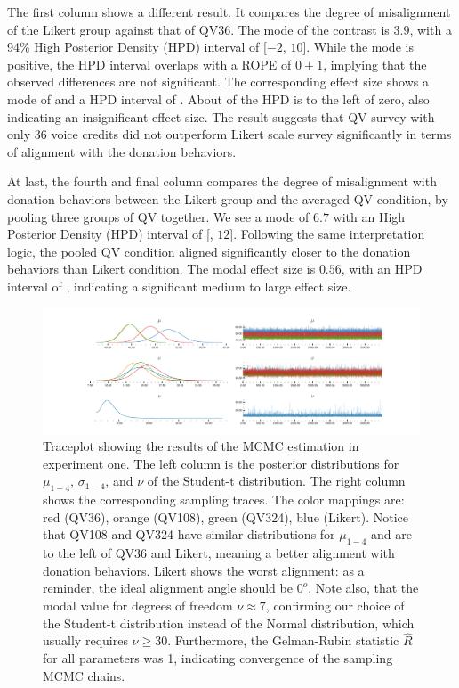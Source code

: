 The first column shows a different result. It compares the degree of misalignment of the Likert group against that of QV36. The mode of the contrast is $3.9$, with a 94\% High Posterior Density (HPD) interval of [$-2$, $10$]. While the mode is positive, the HPD interval overlaps with a ROPE of $0 \pm 1$, implying that the observed differences are not significant. The corresponding effect size shows a mode of {} and a HPD interval of {\change{[$-0.13$, $0.66$]}}. About {} of the HPD is to the left of zero, also indicating an insignificant effect size. The result suggests that QV survey with only 36 voice credits did not outperform Likert scale survey significantly in terms of alignment with the donation behaviors.

At last, the fourth and final column compares the degree of misalignment with donation behaviors between the Likert group and the averaged QV condition, by pooling three groups of QV together. We see a mode of $6.7$ with an High Posterior Density (HPD) interval of [{}, $12$]. Following the same interpretation logic, the pooled QV condition aligned significantly closer to the donation behaviors than Likert condition. The modal effect size is $0.56$, with an HPD interval of {\change{[$0.13$, $0.99$]}}, indicating a significant medium to large effect size.

\begin{figure}
  \centering
  \includegraphics[trim= 2in 0in 2in 0in, clip, width=\textwidth, keepaspectratio=true]{content/image/StudentTIndep_VA_traceplot.pdf}
  \caption{
    Traceplot showing the results of the MCMC estimation in experiment one. The left column is the posterior distributions for $\mu_{1-4}$, $\sigma_{1-4}$, and $\nu$ of the Student-t distribution. The right column shows the corresponding sampling traces. The color mappings are: red (QV36), orange (QV108), green (QV324), blue (Likert). Notice that QV108 and QV324 have similar distributions for $\mu_{1-4}$ and are to the left of QV36 and Likert, meaning a better alignment with donation behaviors. Likert shows the worst alignment: as a reminder, the ideal alignment angle should be $0^o$. Note also, that the modal value for degrees of freedom $\nu \approx 7$, confirming our choice of the Student-t distribution instead of the Normal distribution, which usually requires $\nu \geq 30$. Furthermore, the Gelman-Rubin statistic $\hat{R}$ for all parameters was 1, indicating  convergence of the sampling MCMC chains.
  }
  \label{fig:traceplot_exp1}
\end{figure}
